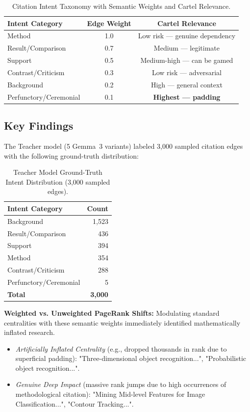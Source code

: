 \begin{table}[H]
\centering
\begin{tabular}{@{}lcc@{}}
\toprule
\textbf{Intent Category} & \textbf{Edge Weight} & \textbf{Cartel Relevance} \\
\midrule
Method & 1.0 & Low risk --- genuine dependency \\
Result/Comparison & 0.7 & Medium --- legitimate \\
Support & 0.5 & Medium-high --- can be gamed \\
Contrast/Criticism & 0.3 & Low risk --- adversarial \\
Background & 0.2 & High --- general context \\
Perfunctory/Ceremonial & 0.1 & \textbf{Highest --- padding} \\
\bottomrule
\end{tabular}
\caption{Citation Intent Taxonomy with Semantic Weights and Cartel Relevance.}
\end{table}

\subsection{Key Findings}
The Teacher model (5 Gemma~3 variants) labeled 3,000 sampled citation edges with the following ground-truth distribution:

\begin{table}[H]
\centering
\begin{tabular}{@{}lr@{}}
\toprule
\textbf{Intent Category} & \textbf{Count} \\
\midrule
Background & 1,523 \\
Result/Comparison & 436 \\
Support & 394 \\
Method & 354 \\
Contrast/Criticism & 288 \\
Perfunctory/Ceremonial & 5 \\
\midrule
\textbf{Total} & \textbf{3,000} \\
\bottomrule
\end{tabular}
\caption{Teacher Model Ground-Truth Intent Distribution (3,000 sampled edges).}
\end{table}

\textbf{Weighted vs. Unweighted PageRank Shifts:} Modulating standard centralities with these semantic weights immediately identified mathematically inflated research.
\begin{itemize}
    \item \textit{Artificially Inflated Centrality} (e.g., dropped thousands in rank due to superficial padding): "Three-dimensional object recognition...", "Probabilistic object recognition...".
    \item \textit{Genuine Deep Impact} (massive rank jumps due to high occurrences of methodological citation): "Mining Mid-level Features for Image Classification...", "Contour Tracking...".
\end{itemize}

